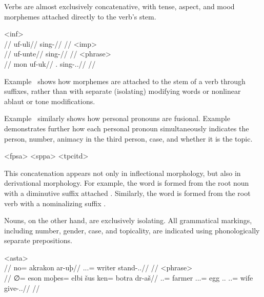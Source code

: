 Verbs are almost exclusively concatenative, with tense, aspect, and mood morphemes attached directly to the verb's stem.

	\a<inf>\begingl
		\glpreamble{}\\
		//
		\gla uf-uli//
		\glb sing-\Inf//
		\glft{}//
	\endgl
	\a<imp>\begingl
		\glpreamble{}\\
		//
		\gla uf-unte//
		\glb sing-\Imp//
		\glft{}//
	\endgl
	\a<phrase>\begingl
		\glpreamble{}\\
		//
		\gla mon uf-uk//
		\glb \Fps.\Top{} sing-\Ind.\Pst.\Pfv//
	\glft{}//
	\endgl
\xe

Example~ shows how morphemes are attached to the stem of a verb through suffixes, rather than with separate (isolating) modifying words or nonlinear ablaut or tone modifications.

Example~ similarly shows how personal pronouns are fusional. Example~ demonstrates further how each personal pronoun simultaneously indicates the person, number, animacy in the third person, case, and whether it is the topic.

	\a<fpsa>    
	\a<sppa>    
	\a<tpcitd>    
\xe

This concatenation appears not only in inflectional morphology, but also in derivational morphology. For example, the word    is formed from the root noun    with a diminutive suffix attached . Similarly, the word    is formed from the root verb    with a nominalizing suffix .

Nouns, on the other hand, are exclusively isolating. All grammatical markings, including number, gender, case, and topicality, are indicated using phonologically separate prepositions.

	\a<asta>\begingl
		\glpreamble{}\\
		//
		\gla no= akrakon ar-uþ//
		\glb \An.\Sg.\Top.\Abs= writer stand-\Ind.\Npst.\Prg//
		\glft{}//
	\endgl
	\a<phrase>\begingl
		\glpreamble{}\\
		//
		\gla ∅= eson moþes= elbi šus ken= botra dr-aš//
		\glb \An.\Sg.\Abs= farmer \In.\Pc.\Top.\Acc= egg \Tps.\An.\Gen{} \An.\Pl.\Dat= wife give-\Ind.\Npst.\Rtsp//
		\glft{}//
	\endgl
\xe

